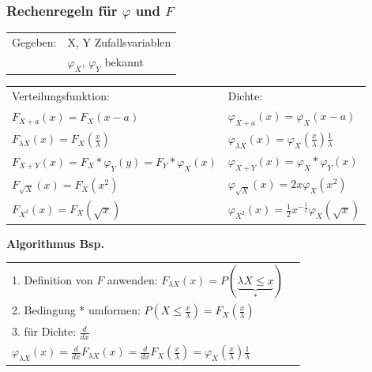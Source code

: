 	\subsubsection{Rechenregeln für $\varphi$ und $F$ }
		\begin{minipage}{11cm}
			\begin{tabular}{ll}
        	Gegeben: &X, Y Zufallsvariablen\\
        	&$\varphi_X$, $\varphi_Y$ bekannt\\
        	\end{tabular}
 
        	\begin{tabular}{p{6cm}p{6cm}}
        	Verteilungsfunktion: &Dichte:\\
        	$F_{X+a}(x)=F_X(x-a)$  &$\varphi_{X+a}(x)=\varphi_X(x-a)$\\
        	$F_{\lambda X}(x)=F_X(\frac{x}{\lambda})$ &$\varphi_{\lambda
        	X}(x)=\varphi_X(\frac{x}{\lambda})\frac{1}{\lambda}$\\
        	$F_{X+Y}(x)=F_X\ast\varphi_Y(y)=F_Y\ast\varphi_X(x)$ &
        	$\varphi_{X+Y}(x)=\varphi_X\ast\varphi_Y(x)$\\
        	$F_{\sqrt{X}}(x)=F_X(x^2)$ &
        	$\varphi_{\sqrt{X}}(x)=2x\varphi_X(x^2)$\\
        	$F_{X^2}(x)=F_X(\sqrt{x})$ &
        	$\varphi_{X^2}(x)=\frac{1}{2}x^{-\frac{1}{2}}\varphi_X(\sqrt{x})$
        	\end{tabular}
		\end{minipage}
		\begin{minipage}{7cm}
        	\textbf{Algorithmus Bsp.}
        	\begin{tabular}{ll}
        	1. Definition von $F$ anwenden: $F_{\lambda X}(x)=P(\underbrace
        	{\lambda X\leq x}_{*})$\\ 
        	2. Bedingung * umformen: $P(X \leq
        	\frac{x}{\lambda})=F_X(\frac{x}{\lambda})$\\ 
        	3. für Dichte: $\frac{d}{dx}$\\
        	\vspace{3mm}
        	$\varphi_{\lambda X}(x)=\frac{d}{dx}F_{\lambda
        	X}(x)=\frac{d}{dx}F_X(\frac{x}{\lambda})=
        	\varphi_X(\frac{x}{\lambda})\frac{1}{\lambda}$
        	\end{tabular}
			\vspace{10mm}
        \end{minipage}

        
        
